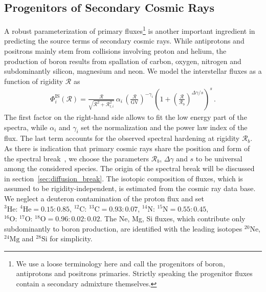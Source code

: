 \documentclass[a4paper,11pt]{article}
\newcommand{\R}{\mathcal{R}}
\begin{document}
\subsection{Progenitors of Secondary Cosmic Rays}\label{sec:progenitors}

A robust parameterization of primary fluxes\footnote{We use a loose terminology here and call the progenitors of boron, antiprotons and positrons primaries. Strictly speaking the progenitor fluxes contain a secondary admixture themselves.} is another important ingredient in predicting the source terms of secondary cosmic rays. While antiprotons and positrons mainly stem from collisions involving proton and helium, the production of boron results from spallation of carbon, oxygen, nitrogen and subdominantly silicon, magnesium and neon. We model the interstellar fluxes as a function of rigidity $\R$ as
\begin{align}\label{eq:primariesFit}
\Phi_i^{\text{IS}}(\R)= \frac{\R}{\sqrt{\R^2+\R_{l,i}^2}} \,\alpha_i\,\left(\frac{\R}{\text{GV}}\right)^{-\gamma_i}\left(1+\left(\frac{\R}{\R_b}\right)^{\Delta\gamma/s}\right)^{s}\,.
\end{align}
The first factor on the right-hand side allows to fit the low energy part of the spectra, while $\alpha_i$ and $\gamma_i$ set the normalization and the power law index of the flux. The last term accounts for the observed spectral hardening at rigidity $\R_b$. As there is indication that primary cosmic rays share the position and form of the spectral break~\cite{Tomassetti:2015doz,Genolini:2017dfb}, we choose the parameters $\R_b$, $\Delta\gamma$ and $s$ to be universal among the considered species. The origin of the spectral break will be discussed in section~\ref{sec:diffusion_break}. The isotopic composition of fluxes, which is assumed to be rigidity-independent, is estimated from the cosmic ray data base. We neglect a deuteron contamination of the proton flux and set $^3\text{He}:\,\! ^4\text{He}= 0.15:0.85$, $^{12}\text{C}:\,\! ^{13}\text{C}= 0.93:0.07$, $^{14}\text{N}:\,\! ^{15}\text{N}= 0.55:0.45$, $^{16}\text{O}:\,\! ^{17}\text{O} : \,\!^{18}\text{O}= 0.96:0.02:0.02$. The Ne, Mg, Si fluxes, which contribute only subdominantly to boron production, are identified with the leading isotopes $^{20}\text{Ne}$, $^{24}\text{Mg}$ and $^{28}\text{Si}$ for simplicity.
\end{document}
